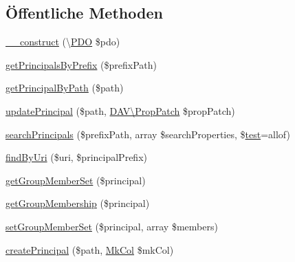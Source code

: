 \subsection*{Öffentliche Methoden}
\begin{DoxyCompactItemize}
\item 
\mbox{\hyperlink{class_sabre_1_1_d_a_v_a_c_l_1_1_principal_backend_1_1_p_d_o_a8dc24b974cbc411d51d213d1677f61aa}{\+\_\+\+\_\+construct}} (\textbackslash{}\mbox{\hyperlink{class_sabre_1_1_d_a_v_a_c_l_1_1_principal_backend_1_1_p_d_o}{P\+DO}} \$pdo)
\item 
\mbox{\hyperlink{class_sabre_1_1_d_a_v_a_c_l_1_1_principal_backend_1_1_p_d_o_aad0ecec88de52a79bb4a2f2dcb024079}{get\+Principals\+By\+Prefix}} (\$prefix\+Path)
\item 
\mbox{\hyperlink{class_sabre_1_1_d_a_v_a_c_l_1_1_principal_backend_1_1_p_d_o_a82ae2b914e3ccfa225f85c42eeb9704a}{get\+Principal\+By\+Path}} (\$path)
\item 
\mbox{\hyperlink{class_sabre_1_1_d_a_v_a_c_l_1_1_principal_backend_1_1_p_d_o_a6fb67ba2c7f6bb64193baf09fcefd586}{update\+Principal}} (\$path, \mbox{\hyperlink{class_sabre_1_1_d_a_v_1_1_prop_patch}{D\+A\+V\textbackslash{}\+Prop\+Patch}} \$prop\+Patch)
\item 
\mbox{\hyperlink{class_sabre_1_1_d_a_v_a_c_l_1_1_principal_backend_1_1_p_d_o_ae26c3e73c6581e3b285fe9079febda27}{search\+Principals}} (\$prefix\+Path, array \$search\+Properties, \$\mbox{\hyperlink{classtest}{test}}=\textquotesingle{}allof\textquotesingle{})
\item 
\mbox{\hyperlink{class_sabre_1_1_d_a_v_a_c_l_1_1_principal_backend_1_1_p_d_o_a0d0a4668010ee313258a8c907e23ed39}{find\+By\+Uri}} (\$uri, \$principal\+Prefix)
\item 
\mbox{\hyperlink{class_sabre_1_1_d_a_v_a_c_l_1_1_principal_backend_1_1_p_d_o_a5efafea05ba269b5482c7cbf1f0d5423}{get\+Group\+Member\+Set}} (\$principal)
\item 
\mbox{\hyperlink{class_sabre_1_1_d_a_v_a_c_l_1_1_principal_backend_1_1_p_d_o_af19a397542ae2ed37d9108fb887139e6}{get\+Group\+Membership}} (\$principal)
\item 
\mbox{\hyperlink{class_sabre_1_1_d_a_v_a_c_l_1_1_principal_backend_1_1_p_d_o_ab240ad8dce1a754c28021bc86b8f5c31}{set\+Group\+Member\+Set}} (\$principal, array \$members)
\item 
\mbox{\hyperlink{class_sabre_1_1_d_a_v_a_c_l_1_1_principal_backend_1_1_p_d_o_a03f1b543079fbffa952356654d2cfca1}{create\+Principal}} (\$path, \mbox{\hyperlink{class_sabre_1_1_d_a_v_1_1_mk_col}{Mk\+Col}} \$mk\+Col)
\end{DoxyCompactItemize}
